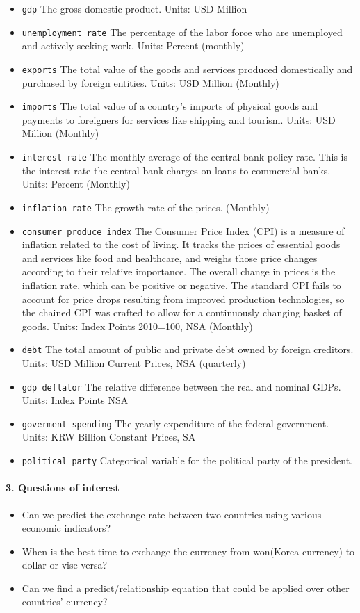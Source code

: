 \documentclass[12pt]{article}
\begin{document}
\begin{itemize}
    \item {\tt gdp} The gross domestic product. Units: USD Million
    \item {\tt unemployment rate} The percentage of the labor force who are unemployed and actively seeking work. Units: Percent (monthly)
    \item {\tt exports} The total value of the goods and services
produced domestically and purchased by foreign entities. Units: USD Million (Monthly)
    \item {\tt imports} The total value of a country's imports of physical goods and payments to foreigners for services like shipping and tourism. Units: USD Million (Monthly)
    \item {\tt interest rate} The monthly average of the central bank policy rate. This is the interest rate the central bank charges on loans to commercial banks. Units: Percent (Monthly)
    \item {\tt inflation rate} The growth rate of the prices. (Monthly)
    \item {\tt consumer produce index} The Consumer Price Index (CPI) is a measure of inflation related to the cost of living. It tracks the prices of essential goods and services like food and healthcare, and weighs those price changes according to their relative importance. The overall change in prices is the inflation rate, which can be positive or negative. The standard CPI fails to account for price drops resulting from improved production technologies, so the chained CPI was crafted to allow for a continuously changing basket of goods. Units: Index Points 2010=100, NSA (Monthly)
    \item {\tt debt} The total amount of public and private debt owned by foreign creditors. Units: USD Million Current Prices, NSA (quarterly)
    \item {\tt gdp deflator} The relative difference between the real and nominal GDPs. Units: Index Points NSA
    \item {\tt goverment spending} The yearly expenditure of the federal government. Units: KRW Billion Constant Prices, SA 
    \item {\tt political party} Categorical variable for the political
party of the president.
\end{itemize}

\paragraph{3. Questions of interest}
\begin{itemize}
    \item Can we predict the exchange rate between two countries using various
economic indicators? 
    \item When is the best time to exchange the currency from won(Korea currency) to dollar or vise versa? 
    \item Can we find a predict/relationship equation that could be applied over other countries' currency? 

\end{itemize}
\end{document}
